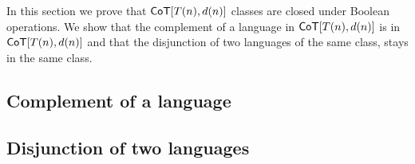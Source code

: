 In this section we prove that $\mathsf{CoT}[T(n), d(n)]$ classes are closed under Boolean operations.
We show that the complement of a language in $\mathsf{CoT}[T(n), d(n)]$ is in $\mathsf{CoT}[T(n), d(n)]$ and that the disjunction of two languages of the same class, stays in the same class.

\subsection{Complement of a language}


\subsection{Disjunction of two languages}\label{det-or}


